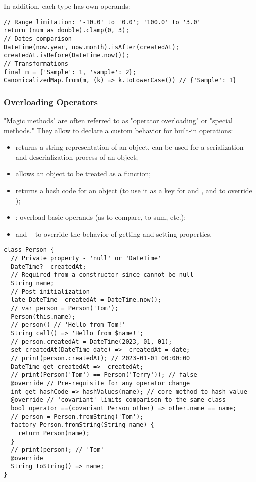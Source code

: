 \noindent In addition, each type has own operands:

\begin{lstlisting}
// Range limitation: '-10.0' to '0.0'; '100.0' to '3.0'
return (num as double).clamp(0, 3);
// Dates comparison
DateTime(now.year, now.month).isAfter(createdAt);
createdAt.isBefore(DateTime.now());
// Transformations
final m = {'Sample': 1, 'sample': 2};
CanonicalizedMap.from(m, (k) => k.toLowerCase()) // {'Sample': 1}
\end{lstlisting}


\newpage
\subsubsection{Overloading Operators}

"Magic methods" are often referred to as "operator overloading" or "special methods." They allow to declare a custom 
behavior for built-in operations:

\begin{itemize}
  \item {} returns a string representation of an object, can be used for a serialization and deserialization 
  process of an object;
  \item {} allows an object to be treated as a function;
  \item {} returns a hash code for an object (to use it as a key for  and , and to override \q{==});
  \item {}: overload basic operands (as \q{==} to compare, \q{+} to sum, etc.);
  \item {} and  -- to override the behavior of getting and setting properties.
\end{itemize}

\begin{lstlisting}
class Person {
  // Private property - 'null' or 'DateTime'
  DateTime? _createdAt;
  // Required from a constructor since cannot be null
  String name;
  // Post-initialization
  late DateTime _createdAt = DateTime.now();
  // var person = Person('Tom');
  Person(this.name);
  // person() // 'Hello from Tom!'
  String call() => 'Hello from $name!';
  // person.createdAt = DateTime(2023, 01, 01);
  set createdAt(DateTime date) => _createdAt = date;
  // print(person.createdAt); // 2023-01-01 00:00:00
  DateTime get createdAt => _createdAt;
  // print(Person('Tom') == Person('Terry')); // false
  @override // Pre-requisite for any operator change
  int get hashCode => hashValues(name); // core-method to hash value
  @override // 'covariant' limits comparison to the same class
  bool operator ==(covariant Person other) => other.name == name;
  // person = Person.fromString('Tom');
  factory Person.fromString(String name) {
    return Person(name);
  }
  // print(person); // 'Tom'
  @override
  String toString() => name;
}
\end{lstlisting}



